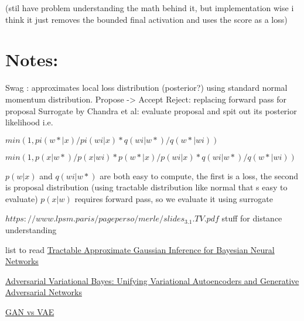 \documentclass[honours,12pt]{unswthesis}
\numberwithin{equation}{section}
\begin{document}
(stil have problem understanding the math behind it, but implementation wise i think it just removes the bounded final activation and uses the score as a loss) 


\section{ Notes:}

Swag : approximates local loss distribution (posterior?) using standard normal momentum distribution.
Propose -> Accept Reject: replacing forward pass for proposal 
Surrogate by Chandra et al: evaluate proposal and spit out its posterior likelihood
    i.e. 
    
    $min(1, pi(w*|x)/pi(wi|x) *  q(wi|w*)/q(w*|wi) )$
    
    $min(1, p(x|w*)/p(x|wi) * p(w*|x)/p(wi|x) *  q(wi|w*)/q(w*|wi) )$

    $p(w|x)$ and $q(wi|w*)$ are both easy to compute, the first is a loss, the second is proposal distribution (using tractable distribution like normal that s easy to evaluate)    
    $p(x|w)$ requires forward pass, so we evaluate it using surrogate


\noindent $https://www.lpsm.paris/pageperso/merle/slides_3.1.TV.pdf$ stuff for distance understanding

list to read
\href{https://jmlr.org/papers/volume22/20-1009/20-1009.pdf}{Tractable Approximate Gaussian Inference for
Bayesian Neural Networks
}

\href{https://arxiv.org/pdf/1701.04722.pdf}{Adversarial Variational Bayes:
Unifying Variational Autoencoders and Generative Adversarial Networks}

\href{https://towardsdatascience.com/gans-vs-autoencoders-comparison-of-deep-generative-models-985cf15936ea}{GAN vs VAE}
\end{document}
